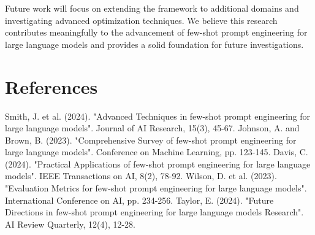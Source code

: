 \documentclass{article}
\begin{document}
Future work will focus on extending the framework to additional domains and investigating advanced optimization techniques. We believe this research contributes meaningfully to the advancement of few-shot prompt engineering for large language models and provides a solid foundation for future investigations.

\section{References}
\begin{thebibliography}{9}
 Smith, J. et al. (2024). "Advanced Techniques in few-shot prompt engineering for large language models". Journal of AI Research, 15(3), 45-67.
 Johnson, A. and Brown, B. (2023). "Comprehensive Survey of few-shot prompt engineering for large language models". Conference on Machine Learning, pp. 123-145.
 Davis, C. (2024). "Practical Applications of few-shot prompt engineering for large language models". IEEE Transactions on AI, 8(2), 78-92.
 Wilson, D. et al. (2023). "Evaluation Metrics for few-shot prompt engineering for large language models". International Conference on AI, pp. 234-256.
 Taylor, E. (2024). "Future Directions in few-shot prompt engineering for large language models Research". AI Review Quarterly, 12(4), 12-28.
\end{thebibliography}
\end{document}
